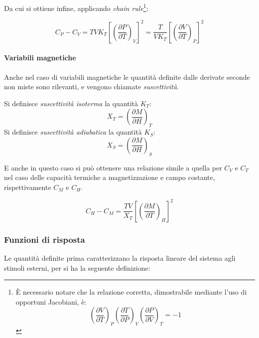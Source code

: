 Da cui si ottiene infine, applicando \textit{chain rule}\footnote{\`E necessario notare che la relazione corretta, dimostrabile mediante l'uso di opportuni Jacobiani, è:
\begin{equation*}
	\left(\frac{\partial V}{\partial T}\right)_P \left(\frac{\partial T}{\partial P}\right)_V \left(\frac{\partial P}{\partial V}\right)_T = -1
\end{equation*}
}:

\begin{equation*}
C_P - C_V = T V K_T \left[\left(\frac{\partial P}{\partial T}\right)_V\right]^2 = \frac{T}{V K_T} \left[\left(\frac{\partial V}{\partial T}\right)_P\right]^2
\end{equation*}

\paragraph{Variabili magnetiche} Anche nel caso di variabili magnetiche le quantità definite dalle derivate seconde non miste sono rilevanti, e vengono chiamate \textit{suscettività.}

\begin{defn}[Suscettività]
	Si definisce \textit{suscettività isoterma} la quantità $K_T$:
	\begin{equation*}
	X_T = \left(\frac{\partial M}{\partial H}\right)_T
	\end{equation*}
	Si definisce \textit{suscettività adiabatica} la quantità $K_S$:
	\begin{equation*}
	X_S = \left(\frac{\partial M}{\partial H}\right)_S
	\end{equation*}
\end{defn}

E anche in questo caso si può ottenere una relazione simile a quella per $C_V$ e $C_T$ nel caso delle capacità termiche a magnetizzazione e campo costante, rispettivamente $C_M$ e $C_H$. 

\begin{equation*}
C_H - C_M = \frac{T V}{X_T} \left[\left(\frac{\partial M}{\partial T}\right)_H\right]^2
\end{equation*}

\subsubsection{Funzioni di risposta} Le quantità definite prima caratterizzano la risposta lineare del sistema agli stimoli esterni, per si ha la seguente definizione:


